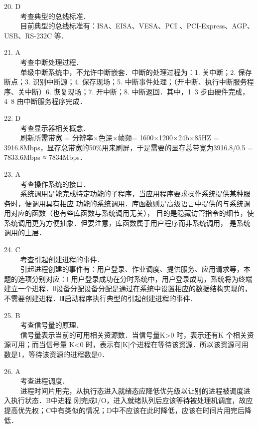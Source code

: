20. D \\
$\qquad$ 考查典型的总线标准． \\
$\qquad$ 目前典型的总线标准有：ISA、EISA、VESA、PCI 、PCI-Express、AGP、USB、RS-232C 等．

21. A \\
$\qquad$ 考查中断处理过程．\\
$\qquad$ 单级中断系统中，不允许中断嵌套．中断的处理过程为：1. 关中断；2. 保存断点；3. 识别中断源；4. 保存现场；5. 中断事件处理；（开中断、执行中断服务程序、关中断）6. 恢复现场；7. 开中断；8. 中断返回．其中，1~3 步由硬件完成，4~8 由中断服务程序完成．

22. D \\
$\qquad$ 考查显示器相关概念．\\
$\qquad$ 刷新所需带宽 = 分辨率×色深×帧频= 1600×1200×24b×85HZ = 3916.8Mbps，显存总带宽的50\%用来刷屏，于是需要的显存总带宽为3916.8/0.5 = 7833.6Mbps ≈ 7834Mbps．

23. A \\
$\qquad$ 考查操作系统的接口．\\
$\qquad$ 系统调用是能完成特定功能的子程序，当应用程序要求操作系统提供某种服务时，便调用具有相应
功能的系统调用．库函数则是高级语言中提供的与系统调用对应的函数（也有些库函数与系统调用无关），
目的是隐藏访管指令的细节，使系统调用更为方便抽象．但要注意，库函数属于用户程序而非系统调用，
是系统调用的上层．

24. C \\
$\qquad$ 考查引起创建进程的事件．\\
$\qquad$ 引起进程创建的事件有：用户登录、作业调度、提供服务、应用请求等，本题的选项分别对应：Ⅰ
用户登录成功在分时系统中，用户登录成功，系统将为终端建立一个进程．Ⅱ设备分配设备分配是通过在系统中设置相应的数据结构实现的，不需要创建进程．Ⅲ启动程序执行典型的引起创建进程的事件．

25. B \\
$\qquad$ 考查信号量的原理．\\
$\qquad$ 信号量表示当前的可用相关资源数．当信号量K>0 时，表示还有K 个相关资源可用；而当信号量
K<0 时，表示有|K|个进程在等待该资源．所以该资源可用数是1，等待该资源的进程数是0．

26. A \\
$\qquad$ 考查进程调度．\\
$\qquad$ 进程时间片用完，从执行态进入就绪态应降低优先级以让别的进程被调度进入执行状态．B中进程
刚完成I/O，进入就绪队列后应该等待被处理机调度，故应提高优先权；C中有类似的情况；D中不应该在此时降低，应该在时间片用完后降低．


